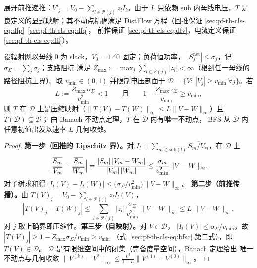 展开前推递推：$V'_j=V_0-\sum_{l\in\mathcal P(j)}z_l I_l$。由于 $I_l$ 只依赖
$\mathrm{sub}$ 内母线电压，$T$ 是良定义的显式映射；其不动点精确满足
DistFlow 方程（回推保证
\eqref{sec:pf-th-cls-eq:dfp}--\eqref{sec:pf-th-cls-eq:dfq}，
前推保证 \eqref{sec:pf-th-cls-eq:dfv}，电流定义保证
\eqref{sec:pf-th-cls-eq:dfl}）。

\begin{theorem}\label{sec:pf-th-cls-thm-bfs}
设辐射网以母线 $0$ 为 slack，$V_0=1\angle0$ 固定；负荷恒功率，
$|S_j^{\mathrm{net}}|\le\sigma_j$，记 $\sigma_\Sigma=\sum_j\sigma_j$；支路阻抗
满足 $Z_{\max}:=\max_j\sum_{l\in\mathcal P(j)}|z_l|<\infty$（根到任一母线的
路径阻抗上界）。取 $v_{\min}\in(0,1)$ 并限制电压剖面于
$\mathcal D=\{V:\ |V_j|\ge v_{\min}\ \forall j\}$。若
\begin{equation}
L:=\frac{Z_{\max}\,\sigma_\Sigma}{v_{\min}^2}<1
\qquad\text{且}\qquad
1-\frac{Z_{\max}\sigma_\Sigma}{v_{\min}}\ge v_{\min},
\label{sec:pf-th-cls-eq:bfsc}
\end{equation}
则 $T$ 在 $\mathcal D$ 上是压缩映射（$\lVert T(V)-T(W)\rVert_\infty\le
L\lVert V-W\rVert_\infty$）且 $T(\mathcal D)\subseteq\mathcal D$；
由 Banach 不动点定理，$T$ 在 $\mathcal D$ 内有\textbf{唯一}不动点，
BFS 从 $\mathcal D$ 内任意初值出发以速率 $L$ 几何收敛。
\end{theorem}

\begin{proof}
\textbf{第一步（回推的 Lipschitz 界）。}对
$I_l=\sum_{m\in\mathrm{sub}(l)}\overline{S_m/V_m}$，在 $\mathcal D$ 上
\begin{equation*}
\Bigl|\frac{\overline{S_m}}{\overline{V_m}}-\frac{\overline{S_m}}{\overline{W_m}}\Bigr|
=\frac{|S_m|\,|V_m-W_m|}{|V_m|\,|W_m|}
\le\frac{\sigma_m}{v_{\min}^2}\,\lVert V-W\rVert_\infty,
\end{equation*}
对子树求和得
$|I_l(V)-I_l(W)|\le\bigl(\sigma_\Sigma/v_{\min}^2\bigr)\lVert V-W\rVert_\infty$。
\textbf{第二步（前推传播）。}由 $T(V)_j=V_0-\sum_{l\in\mathcal P(j)}z_l I_l(V)$，
\begin{equation*}
|T(V)_j-T(W)_j|\le\sum_{l\in\mathcal P(j)}|z_l|\,
\frac{\sigma_\Sigma}{v_{\min}^2}\lVert V-W\rVert_\infty
\le L\,\lVert V-W\rVert_\infty,
\end{equation*}
对 $j$ 取上确界即压缩性。\textbf{第三步（自映射）。}对 $V\in\mathcal D$，
$|I_l(V)|\le\sigma_\Sigma/v_{\min}$，故
$|T(V)_j|\ge1-Z_{\max}\sigma_\Sigma/v_{\min}\ge v_{\min}$
（式~\eqref{sec:pf-th-cls-eq:bfsc} 第二式），即 $T(V)\in\mathcal D$。
$\mathcal D$ 是有限维空间中的闭集（完备度量空间），Banach 定理给出
唯一不动点与几何收敛 $\lVert V^{(k)}-V^*\rVert_\infty\le
\frac{L^k}{1-L}\lVert V^{(1)}-V^{(0)}\rVert_\infty$。
\end{proof}

